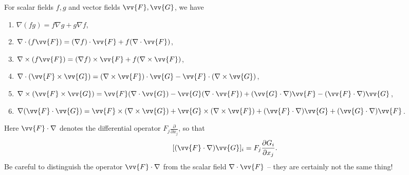 \begin{proposition}
	For scalar fields $f, g$ and vector fields $\vv{F}, \vv{G}$, we have
	\begin{enumerate}[label=(\roman*)]
		\item $\nabla(fg) = f \nabla g + g \nabla f$,
		\item $\nabla \cdot (f \vv{F}) = (\nabla f) \cdot \vv{F} + f (\nabla \cdot \vv{F})$,
		\item $\nabla \times (f \vv{F}) = (\nabla f) \times \vv{F} + f (\nabla \times \vv{F})$,
		\item $\nabla \cdot (\vv{F} \times \vv{G}) = (\nabla \times \vv{F}) \cdot \vv{G} - \vv{F} \cdot (\nabla \times \vv{G})$,
		\item $\nabla \times (\vv{F} \times \vv{G}) = \vv{F} (\nabla \cdot \vv{G}) - \vv{G}(\nabla \cdot \vv{F}) + (\vv{G} \cdot \nabla) \vv{F} - (\vv{F} \cdot \nabla) \vv{G}$,
		\item $\nabla (\vv{F} \cdot \vv{G}) = \vv{F} \times (\nabla \times \vv{G}) + \vv{G} \times (\nabla \times \vv{F}) + (\vv{F} \cdot \nabla) \vv{G} + (\vv{G} \cdot \nabla) \vv{F}$.
	\end{enumerate}
\end{proposition}

Here $\vv{F} \cdot \nabla$ denotes the differential operator $F_j \frac{\partial}{\partial x_j}$, so that
$$
[(\vv{F} \cdot \nabla) \vv{G}]_i = F_j \frac{\partial G_i}{\partial x_j}.
$$
Be careful to distinguish the operator $\vv{F} \cdot \nabla$ from the scalar field $\nabla \cdot \vv{F}$ -- they are certainly not the same thing!

